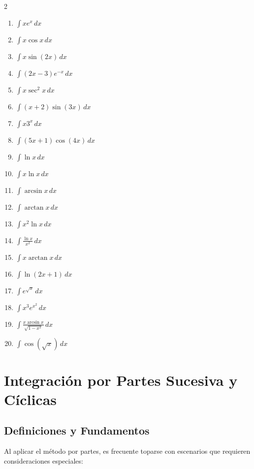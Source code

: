 \documentclass[12pt, letterpaper]{article}
\newcommand{\dx}{\,dx}
\begin{document}
\begin{multicols}{2}
\begin{enumerate}[leftmargin=*, resume]
  \item \facil{} $\int x e^x \dx$
  \item \facil{} $\int x \cos x \dx$
  \item \facil{} $\int x \sin(2x) \dx$
  \item \facil{} $\int (2x - 3) e^{-x} \dx$
  \item \medio{} $\int x \sec^2 x \dx$
  \item \medio{} $\int (x + 2) \sin(3x) \dx$
  \item \medio{} $\int x 3^x \dx$
  \item \medio{} $\int (5x + 1) \cos(4x) \dx$
  \item \medio{} $\int \ln x \dx$
  \item \medio{} $\int x \ln x \dx$
  \item \medio{} $\int \arcsin x \dx$
  \item \medio{} $\int \arctan x \dx$
  \item \medio{} $\int x^2 \ln x \dx$
  \item \dificil{} $\int \frac{\ln x}{x^2} \dx$
  \item \dificil{} $\int x \arctan x \dx$
  \item \dificil{} $\int \ln(2x + 1) \dx$
  \item \dificil{} $\int e^{\sqrt{x}} \dx$
  \item \dificil{} $\int x^3 e^{x^2} \dx$
  \item \dificil{} $\int \frac{x \arcsin x}{\sqrt{1-x^2}} \dx$
  \item \dificil{} $\int \cos(\sqrt{x}) \dx$
\end{enumerate}
\end{multicols}

\vspace{10pt}

\section{Integración por Partes Sucesiva y Cíclicas}

\subsection{Definiciones y Fundamentos}
Al aplicar el método por partes, es frecuente toparse con escenarios que requieren consideraciones especiales:
\end{document}
